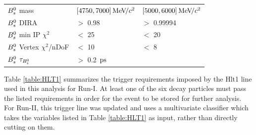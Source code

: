 \begin{table}[h]
{\begin{tabular}{l l l}
${{B}^0_{s}}$ mass  & $ [4750, 7000] {\mathrm{\,Me\kern -0.1em V\!/}c^2}$ & $[5000,6000] {\mathrm{\,Me\kern -0.1em V\!/}c^2}$ \\
${{B}^0_{s}}$ DIRA & $>$ 0.98  & $>$ 0.99994 \\
${{B}^0_{s}}$ min IP $\chi^{2}$ & $<$ 25  & $<$ 20  \\
${{B}^0_{s}}$ Vertex $\chi^{2}$/nDoF & $<$ 10 & $<$ 8   \\
${{B}^0_{s}}$ ${\tau_{{{B}^0_{s}}}}$ & $>$ 0.2 ${\mathrm{ \,ps}}$ & \\
 \hline
\end{tabular}
}
\label{table:StrippingCuts}
\end{table}

\clearpage
\noindent Table \ref{table:HLT1} summarizes the trigger requirements imposed by the Hlt1 line used in this analysis for Run-I.
At least one of the six decay particles must pass the listed requirements in order for the event to be stored for further analysis.
For Run-II, this trigger line was updated and uses a multivariate classifier which takes the variables listed in Table \ref{table:HLT1} as input, rather than directly cutting on them. 


